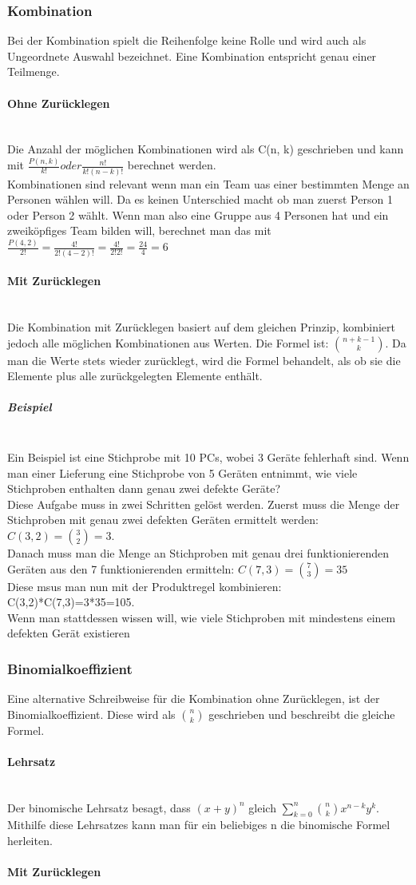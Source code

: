 \documentclass{article}
\newcommand{\paragraphlb}[1]{\paragraph{#1}\mbox{}\\}
\newcommand{\subparagraphlb}[1]{\subparagraph{#1}\mbox{}\\}
\begin{document}
	\subsubsection{Kombination}
	Bei der Kombination spielt die Reihenfolge keine Rolle und wird auch als Ungeordnete Auswahl bezeichnet. Eine Kombination entspricht genau einer Teilmenge. 
	\paragraphlb{Ohne Zurücklegen}
	Die Anzahl der möglichen Kombinationen wird als C(n, k) geschrieben und kann mit $\frac{P(n, k)}{k!} oder \frac{n!}{k!(n-k)!}$ berechnet werden. \\
	Kombinationen sind relevant wenn man ein Team uas einer bestimmten Menge an Personen wählen will. Da es keinen Unterschied macht ob man zuerst Person 1 oder Person 2 wählt. Wenn man also eine Gruppe aus 4 Personen hat und ein zweiköpfiges Team bilden will, berechnet man das mit $\frac{P(4,2)}{2!}=\frac{4!}{2!(4-2)!}=\frac{4!}{2!2!}=\frac{24}{4}=6$
	\paragraphlb{Mit Zurücklegen}
	Die Kombination mit Zurücklegen basiert auf dem gleichen Prinzip, kombiniert jedoch alle möglichen Kombinationen aus Werten. Die Formel ist: $\binom{n+k-1}{k}$. Da man die Werte stets wieder zurücklegt, wird die Formel behandelt, als ob sie die Elemente plus alle zurückgelegten Elemente enthält.
	\subparagraphlb{Beispiel}
	Ein Beispiel ist eine Stichprobe mit 10 PCs, wobei 3 Geräte fehlerhaft sind. Wenn man einer Lieferung eine Stichprobe von 5 Geräten entnimmt, wie viele Stichproben enthalten dann genau zwei defekte Geräte? \\
	Diese Aufgabe muss in zwei Schritten gelöst werden. Zuerst muss die Menge der Stichproben mit genau zwei defekten Geräten ermittelt werden: $C(3,2)=\binom{3}{2}=3$. \\
	Danach muss man die Menge an Stichproben mit genau drei funktionierenden Geräten aus den 7 funktionierenden ermitteln: $C(7,3)=\binom{7}{3}=35$ \\
	Diese msus man nun mit der Produktregel kombinieren: C(3,2)*C(7,3)=3*35=105. \\
	Wenn man stattdessen wissen will, wie viele Stichproben mit mindestens einem defekten Gerät existieren
	\subsubsection{Binomialkoeffizient}
	Eine alternative Schreibweise für die Kombination ohne Zurücklegen, ist der Binomialkoeffizient. Diese wird als $\binom{n}{k}$ geschrieben und beschreibt die gleiche Formel.
	\paragraphlb{Lehrsatz}
	Der binomische Lehrsatz besagt, dass $(x+y)^n$ gleich $\sum_{k=0}^{n}\binom{n}{k}x^{n-k}y^k$. Mithilfe diese Lehrsatzes kann man für ein beliebiges n die binomische Formel herleiten.
	\paragraphlb{Mit Zurücklegen}
\end{document}
